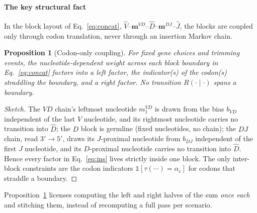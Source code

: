 \documentclass[11pt]{article}
\theoremstyle{oldplain}
\newtheorem{proposition}{Proposition}
\theoremstyle{oldrem}
\newcommand{\indic}{\mathds{1}}
\begin{document}
\paragraph{The key structural fact} In the block layout of Eq.~\eqref{eq:concat},
$\hat V$--$\mathbf{m}^{VD}$--$\hat D$--$\mathbf{m}^{DJ}$--$\hat J$, the blocks are coupled only through
codon translation, never through an insertion Markov chain.

\begin{proposition}[Codon-only coupling]\label{prop:coupling}
For fixed gene choices and trimming events, the nucleotide-dependent weight
across each block boundary in Eq.~\eqref{eq:concat} factors into a left
factor, the indicator(s) of the codon(s) straddling the boundary, and a right factor. No transition
$R(\cdot\mid\cdot)$ spans a boundary.
\end{proposition}
\begin{proof}[Sketch]
The $VD$ chain's leftmost nucleotide $m^{VD}_1$ is drawn from the bias $b_{VD}$ independent of the last
$V$ nucleotide, and its rightmost nucleotide carries no transition into $\hat D$; the $D$ block is
germline (fixed nucleotides, no chain); the $DJ$ chain, read $3'\!\to\!5'$, draws its $J$-proximal
nucleotide from $b_{DJ}$ independent of the first $J$ nucleotide, and its $D$-proximal nucleotide carries
no transition into $\hat D$. Hence every factor in Eq.~\eqref{eq:ins} lives strictly inside one block.
The only inter-block constraints are the codon indicators $\indic[\tau(\cdots)=\alpha_c]$ for codons that
straddle a boundary.
\end{proof}

Proposition~\ref{prop:coupling} licenses computing the left and right halves of the sum \emph{once each}
and stitching them, instead of recomputing a full pass per scenario.
\end{document}
